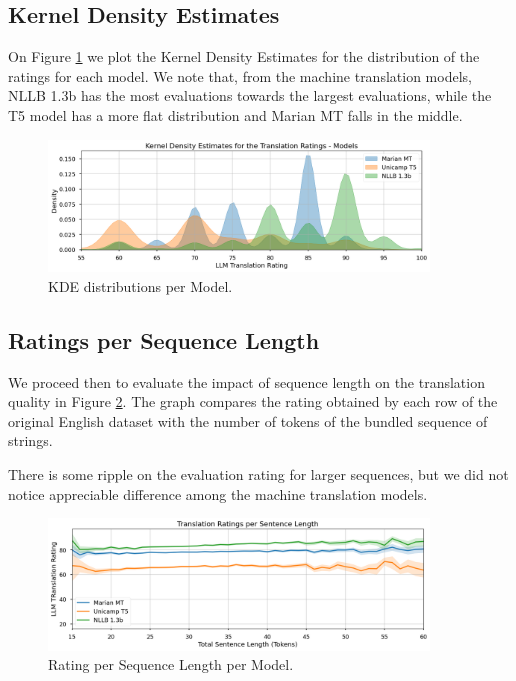 \documentclass{article}
\begin{document}
\subsection{Kernel Density Estimates}

On Figure \ref{fig:kde} we plot the Kernel Density Estimates for the
distribution of the ratings for each model. We note that, from the machine
translation models, NLLB 1.3b has the most evaluations towards the largest
evaluations, while the T5 model has a more flat distribution and Marian MT falls
in the middle.

\begin{figure}[htbp]
    \centering
    \includegraphics[width=0.9\textwidth]{figures/kde.png}
    \caption{\label{fig:kde}KDE distributions per Model.}
\end{figure}
\FloatBarrier

\subsection{Ratings per Sequence Length}

We proceed then to evaluate the impact of sequence length on the translation
quality in Figure \ref{fig:line-chart}. The graph compares the rating obtained
by each row of the original English dataset with the number of tokens of the
bundled sequence of strings. 

There is some ripple on the evaluation rating for larger sequences, but we did
not notice appreciable difference among the machine translation models.

\begin{figure}[htpb]
    \centering
    \includegraphics[width=0.9\textwidth]{figures/line-chart.png}
    \caption{\label{fig:line-chart}Rating per Sequence Length per Model.}
\end{figure}
\end{document}
